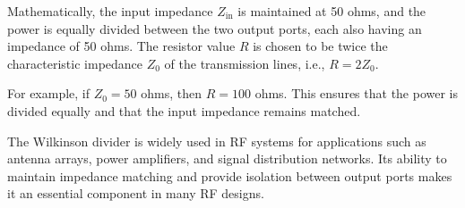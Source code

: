 Mathematically, the input impedance \( Z_{\text{in}} \) is maintained at 50 ohms, and the power is equally divided between the two output ports, each also having an impedance of 50 ohms. The resistor value \( R \) is chosen to be twice the characteristic impedance \( Z_0 \) of the transmission lines, i.e., \( R = 2Z_0 \).

For example, if \( Z_0 = 50 \) ohms, then \( R = 100 \) ohms. This ensures that the power is divided equally and that the input impedance remains matched.

The Wilkinson divider is widely used in RF systems for applications such as antenna arrays, power amplifiers, and signal distribution networks. Its ability to maintain impedance matching and provide isolation between output ports makes it an essential component in many RF designs.

